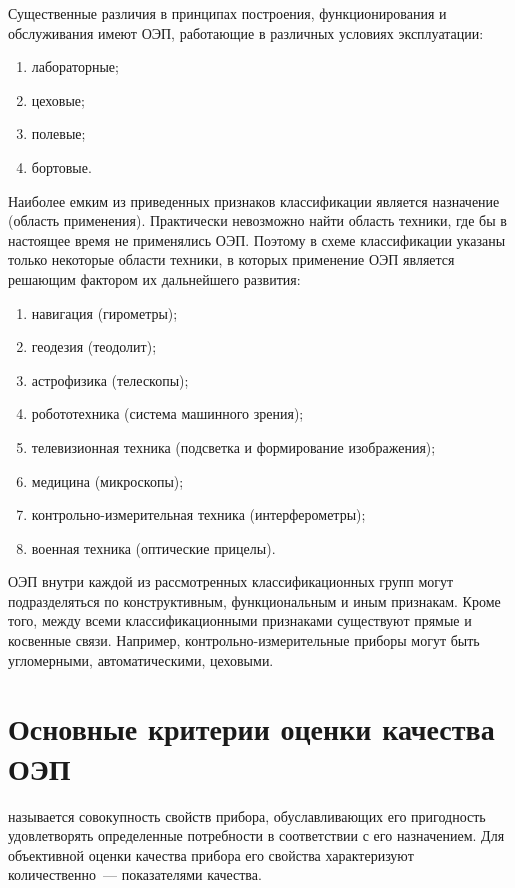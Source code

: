 \documentclass{tufte-book}
\begin{document}
Существенные различия в принципах построения, функционирования и обслуживания имеют ОЭП, работающие в различных условиях эксплуатации:
\begin{enumerate}
	\item лабораторные;
	\item цеховые;
	\item полевые;
	\item бортовые.
\end{enumerate}

Наиболее емким из приведенных признаков классификации является назначение (область применения). Практически невозможно найти область техники, где бы в настоящее время не применялись ОЭП. Поэтому в схеме классификации указаны только некоторые области техники, в которых применение ОЭП является решающим фактором их дальнейшего развития: 
\begin{enumerate}
	\item навигация (гирометры);
	\item геодезия (теодолит);
	\item астрофизика (телескопы);
	\item робототехника (система машинного зрения);
	\item телевизионная техника (подсветка и формирование изображения);
	\item медицина (микроскопы);
	\item контрольно-измерительная техника (интерферометры);
	\item военная техника (оптические прицелы).
\end{enumerate}

ОЭП внутри каждой из рассмотренных классификационных групп могут подразделяться по конструктивным, функциональным и иным признакам. Кроме того, между всеми классификационными признаками существуют прямые и косвенные связи. Например, контрольно-измерительные приборы могут быть угломерными, автоматическими, цеховыми.

\section{Основные критерии оценки качества ОЭП}

 называется совокупность свойств прибора, обуславливающих его пригодность удовлетворять определенные потребности в соответствии с его назначением. Для объективной оценки качества прибора его свойства характеризуют количественно~--- показателями качества.
\end{document}
